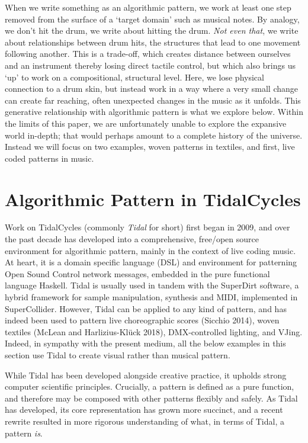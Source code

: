 \documentclass{nime-alternate} %
\begin{document}
When we write something as an algorithmic pattern, we work at least one
step removed from the surface of a `target domain' such as musical
notes. By analogy, we don't hit the drum, we write about hitting the
drum. \emph{Not even that}, we write about relationships between drum
hits, the structures that lead to one movement following another. This
is a trade-off, which creates distance between ourselves and an
instrument thereby losing direct tactile control, but which also brings
us `up' to work on a compositional, structural level. Here, we lose
physical connection to a drum skin, but instead work in a way where a
very small change can create far reaching, often unexpected changes in
the music as it unfolds. This generative relationship with algorithmic
pattern is what we explore below. Within the limits of this paper, we
are unfortunately unable to explore the expansive world in-depth; that
would perhaps amount to a complete history of the universe. Instead we
will focus on two examples, woven patterns in textiles, and first, live
coded patterns in music.

\hypertarget{algorithmic-pattern-in-tidalcycles}{%
\section{Algorithmic Pattern in
TidalCycles}\label{algorithmic-pattern-in-tidalcycles}}

Work on TidalCycles (commonly \emph{Tidal} for short) first began in
2009, and over the past decade has developed into a comprehensive,
free/open source environment for algorithmic pattern, mainly in the
context of live coding music. At heart, it is a domain specific language
(DSL) and environment for patterning Open Sound Control network
messages, embedded in the pure functional language Haskell. Tidal is
usually used in tandem with the SuperDirt software, a hybrid framework
for sample manipulation, synthesis and MIDI, implemented in
SuperCollider. However, Tidal can be applied to any kind of pattern, and
has indeed been used to pattern live choreographic scores (Sicchio
2014), woven textiles (McLean and Harlizius-Klück 2018), DMX-controlled
lighting, and VJing. Indeed, in sympathy with the present medium, all
the below examples in this section use Tidal to create visual rather
than musical pattern.

While Tidal has been developed alongside creative practice, it upholds
strong computer scientific principles. Crucially, a pattern is defined
as a pure function, and therefore may be composed with other patterns
flexibly and safely. As Tidal has developed, its core representation has
grown more succinct, and a recent rewrite resulted in more rigorous
understanding of what, in terms of Tidal, a pattern \emph{is}.
\end{document}
